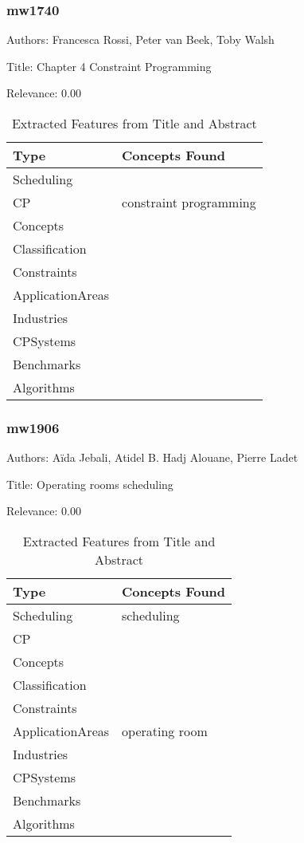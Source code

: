 \subsubsection{mw1740}
\label{mw:mw1740}

Authors: Francesca Rossi, Peter van Beek, Toby Walsh

Title: Chapter 4 Constraint Programming

Relevance:  0.00

{\scriptsize
\begin{longtable}{p{2cm}p{20cm}}
\caption{Extracted Features from Title and Abstract}\\ \toprule
Type & Concepts Found\\ \midrule
\endhead
\bottomrule
\endfoot
Scheduling & \\ 
CP & constraint programming\\ 
Concepts & \\ 
Classification & \\ 
Constraints & \\ 
ApplicationAreas & \\ 
Industries & \\ 
CPSystems & \\ 
Benchmarks & \\ 
Algorithms & \\ 
\end{longtable}
}



\subsubsection{mw1906}
\label{mw:mw1906}

Authors: Aïda Jebali, Atidel B. Hadj Alouane, Pierre Ladet

Title: Operating rooms scheduling

Relevance:  0.00

{\scriptsize
\begin{longtable}{p{2cm}p{20cm}}
\caption{Extracted Features from Title and Abstract}\\ \toprule
Type & Concepts Found\\ \midrule
\endhead
\bottomrule
\endfoot
Scheduling & scheduling\\ 
CP & \\ 
Concepts & \\ 
Classification & \\ 
Constraints & \\ 
ApplicationAreas & operating room\\ 
Industries & \\ 
CPSystems & \\ 
Benchmarks & \\ 
Algorithms & \\ 
\end{longtable}
}



